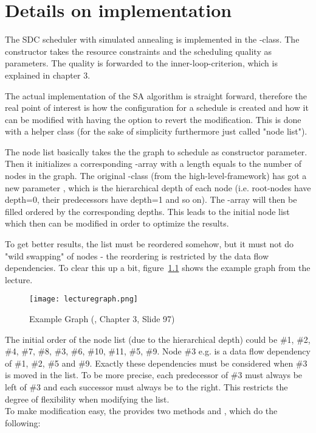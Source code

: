 \chapter{Details on implementation}

The SDC scheduler with simulated annealing is implemented in the -class. The constructor takes the resource constraints and the scheduling quality as parameters. The quality is forwarded to the inner-loop-criterion, which is explained in chapter 3.\par
The actual implementation of the SA algorithm is straight forward, therefore the real point of interest is how the configuration for a schedule is created and how it can be modified with having the option to revert the modification. This is done with a helper class  (for the sake of simplicity furthermore just called "node list").\par
The node list basically takes the the graph to schedule as constructor parameter. Then it initializes a corresponding -array with a length equals to the number of nodes in the graph. The original -class (from the high-level-framework) has got a new parameter , which is the hierarchical depth of each node (i.e. root-nodes have depth=0, their predecessors have depth=1 and so on). The -array will then be filled ordered by the corresponding depths. This leads to the initial node list which then can be modified in order to optimize the results.\par
To get better results, the list must be reordered somehow, but it must not do "wild swapping" of nodes - the reordering is restricted by the data flow dependencies. To clear this up a bit, figure~\ref{fig:lecturegraph} shows the example graph from the lecture.
\begin{figure}
	\centering
	\texttt{[image: lecturegraph.png]}
	\caption{Example Graph (\cite{Hochberger2017}, Chapter 3, Slide 97)}
	\label{fig:lecturegraph}
\end{figure}

The initial order of the node list (due to the hierarchical depth) could be \#1, \#2, \#4, \#7, \#8, \#3, \#6, \#10, \#11, \#5, \#9. Node \#3 e.g. is a data flow dependency of \#1, \#2, \#5 and \#9. Exactly these dependencies must be considered when \#3 is moved in the list. To be more precise, each predecessor of \#3 must always be left of \#3 and each successor must always be to the right. This restricts the degree of flexibility when modifying the list.\\
To make modification easy, the  provides two methods  and , which do the following:\\

